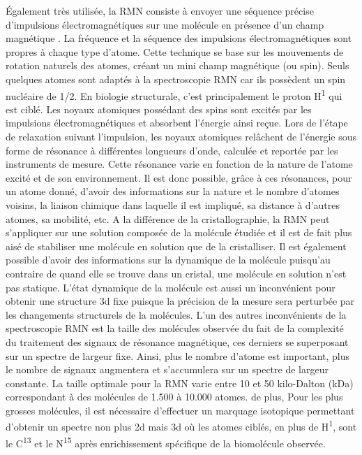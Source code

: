 Également très utilisée, la RMN consiste à envoyer une séquence précise d'impulsions électromagnétiques sur une molécule en présence d'un champ magnétique \cite{wuthrich1986nmr}. La fréquence et la séquence des impulsions électromagnétiques sont propres à chaque type d'atome. Cette technique se base sur les mouvements de rotation naturels des atomes, créant un mini champ magnétique (ou spin). Seuls quelques atomes sont adaptés à la spectroscopie RMN car ils possèdent un spin nucléaire de 1/2. En biologie structurale, c'est principalement le proton H\textsuperscript{1} qui est ciblé. Les noyaux atomiques possédant des spins sont excités par les impulsions électromagnétiques et absorbent l'énergie ainsi reçue. Lors de l'étape de relaxation suivant l'impulsion, les noyaux atomiques relâchent de l'énergie sous forme de résonance à différentes longueurs d'onde, calculée et reportée par les instruments de mesure. Cette résonance varie en fonction de la nature de l'atome excité et de son environnement. Il est donc possible, grâce à ces résonances, pour un atome donné, d'avoir des informations sur la nature et le nombre d'atomes voisins, la liaison chimique dans laquelle il est impliqué, sa distance à d'autres atomes, sa mobilité, etc. A la différence de la cristallographie, la RMN peut s'appliquer sur une solution composée de la molécule étudiée et il est de fait plus aisé de stabiliser une molécule en solution que de la cristalliser. Il est également possible d'avoir des informations sur la dynamique de la molécule puisqu'au contraire de quand elle se trouve dans un cristal, une molécule en solution n'est pas statique.
L'état dynamique de la molécule est aussi un inconvénient pour obtenir une structure 3d fixe puisque la précision de la mesure sera perturbée par les changements structurels de la molécules. L'un des autres inconvénients de la spectroscopie RMN est la taille des molécules observée du fait de la complexité du traitement des signaux de résonance magnétique, ces derniers se superposant sur un spectre de largeur fixe. Ainsi, plus le nombre d'atome est important, plus le nombre de signaux augmentera et s'accumulera sur un spectre de largeur constante. La taille optimale pour la RMN varie entre 10 et 50 kilo-Dalton (kDa) correspondant à des molécules de 1.500 à 10.000 atomes. de plus, Pour les plus grosses molécules, il est nécessaire d'effectuer un marquage isotopique permettant d'obtenir un spectre non plus 2d mais 3d où les atomes ciblés, en plus de H\textsuperscript{1}, sont le C\textsuperscript{13} et le N\textsuperscript{15} après enrichissement spécifique de la biomolécule observée.

